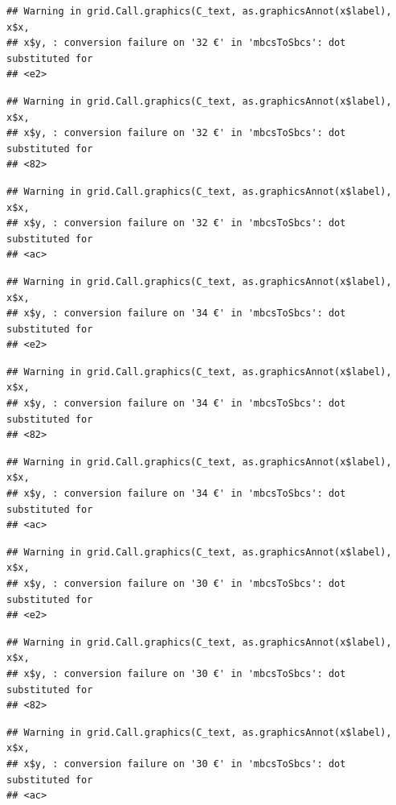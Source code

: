 \documentclass[]{gitbook}
\theoremstyle{definition}
\theoremstyle{definition}
\theoremstyle{definition}
\theoremstyle{remark}
\begin{document}
\begin{verbatim}
## Warning in grid.Call.graphics(C_text, as.graphicsAnnot(x$label), x$x,
## x$y, : conversion failure on '32 €' in 'mbcsToSbcs': dot substituted for
## <e2>
\end{verbatim}

\begin{verbatim}
## Warning in grid.Call.graphics(C_text, as.graphicsAnnot(x$label), x$x,
## x$y, : conversion failure on '32 €' in 'mbcsToSbcs': dot substituted for
## <82>
\end{verbatim}

\begin{verbatim}
## Warning in grid.Call.graphics(C_text, as.graphicsAnnot(x$label), x$x,
## x$y, : conversion failure on '32 €' in 'mbcsToSbcs': dot substituted for
## <ac>
\end{verbatim}

\begin{verbatim}
## Warning in grid.Call.graphics(C_text, as.graphicsAnnot(x$label), x$x,
## x$y, : conversion failure on '34 €' in 'mbcsToSbcs': dot substituted for
## <e2>
\end{verbatim}

\begin{verbatim}
## Warning in grid.Call.graphics(C_text, as.graphicsAnnot(x$label), x$x,
## x$y, : conversion failure on '34 €' in 'mbcsToSbcs': dot substituted for
## <82>
\end{verbatim}

\begin{verbatim}
## Warning in grid.Call.graphics(C_text, as.graphicsAnnot(x$label), x$x,
## x$y, : conversion failure on '34 €' in 'mbcsToSbcs': dot substituted for
## <ac>
\end{verbatim}

\begin{verbatim}
## Warning in grid.Call.graphics(C_text, as.graphicsAnnot(x$label), x$x,
## x$y, : conversion failure on '30 €' in 'mbcsToSbcs': dot substituted for
## <e2>
\end{verbatim}

\begin{verbatim}
## Warning in grid.Call.graphics(C_text, as.graphicsAnnot(x$label), x$x,
## x$y, : conversion failure on '30 €' in 'mbcsToSbcs': dot substituted for
## <82>
\end{verbatim}

\begin{verbatim}
## Warning in grid.Call.graphics(C_text, as.graphicsAnnot(x$label), x$x,
## x$y, : conversion failure on '30 €' in 'mbcsToSbcs': dot substituted for
## <ac>
\end{verbatim}
\end{document}
